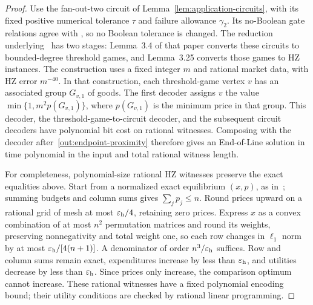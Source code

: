 \begin{proof}
Use the fan-out-two circuit of Lemma~\ref{lem:application-circuits},
with its fixed positive numerical tolerance $\tau$ and failure
allowance $\gamma_2$. Its no-Boolean gate relations agree with
\cite[Table~1]{HZ2026}, so no Boolean tolerance is changed.
The reduction underlying~\cite[Theorem~3.2]{HZ2026} has two stages:
Lemma~3.4 of that paper converts these circuits to bounded-degree
threshold games, and Lemma~3.25 converts those games to HZ instances.
The construction uses a fixed integer $m$ and rational market data,
with HZ error $m^{-40}$. In that construction, each threshold-game
vertex $v$ has an associated group $G_{v,1}$ of goods. The first
decoder assigns $v$ the value $\min\{1,m^2p(G_{v,1})\}$, where
$p(G_{v,1})$ is the minimum price in that group. This decoder, the
threshold-game-to-circuit decoder, and the subsequent circuit decoders
have polynomial bit cost on rational witnesses. Composing
with the decoder after~\eqref{out:endpoint-proximity} therefore gives
an End-of-Line solution in time polynomial in the input and total
rational witness length.

For completeness, polynomial-size rational HZ witnesses preserve the
exact equalities above. Start from a normalized exact equilibrium
$(x,p)$, as in~\cite[Lemma~B.2]{HZ2026}; summing budgets and column
sums gives $\sum_jp_j\leq n$.
Round prices upward on a rational grid of mesh at most
$\varepsilon_{\rm h}/4$, retaining zero prices. Express $x$ as a convex
combination of at most $n^2$ permutation matrices and round its
weights, preserving nonnegativity and total weight one, so each row
changes in $\ell_1$ norm by at most $\varepsilon_{\rm h}/[4(n+1)]$.
A denominator of order $n^3/\varepsilon_{\rm h}$ suffices. Row and column
sums remain exact, expenditures increase by less than $\varepsilon_{\rm h}$,
and utilities decrease by less than $\varepsilon_{\rm h}$. Since prices only
increase, the comparison optimum cannot increase. These rational
witnesses have a fixed polynomial encoding bound; their utility
conditions are checked by rational linear programming.
\end{proof}

